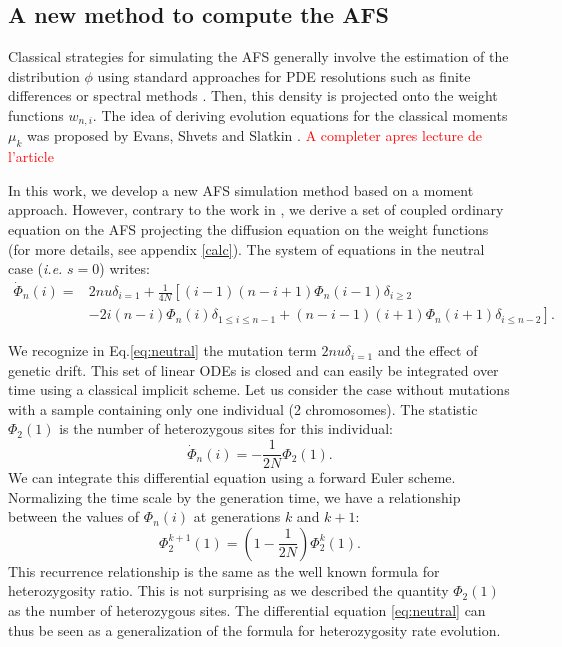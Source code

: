 \subsection{A new method to compute the AFS}
Classical strategies for simulating the AFS generally involve the estimation of the distribution $\phi$ using standard approaches for PDE resolutions such as finite differences \cite{gutenkunst2009} or spectral methods \cite{lukic2011}. Then, this density is projected onto the weight functions $w_{n,i}$.
The idea of deriving evolution equations for the classical moments $\mu_k$ was proposed by Evans, Shvets and Slatkin \cite{evans2007}. \textcolor{red}{A completer apres lecture de l'article}

In this work, we develop a new AFS simulation method based on a moment approach. However, contrary to the work in \cite{evans2007}, we derive a set of coupled ordinary equation on the AFS projecting the diffusion equation on the weight functions (for more details, see appendix \ref{calc}). The system of equations in the neutral case (\textit{i.e.} $s = 0$) writes:
\begin{equation}
\begin{split}
\dot \Phi_n(i)=& 2nu  \delta_{i=1} + \frac{1}{4 N} \left[ (i-1)(n-i+1) \Phi_n(i-1)\delta_{i\geq 2} \right.\\
		      & \left.-2i(n-i)\Phi_n(i)\delta_{1\leq i\leq n-1}  + (n-i-1)(i+1)\Phi_n(i+1)\delta_{i\leq n-2} \right].
\end{split}
\label{eq:neutral}
\end{equation}

We recognize in Eq.\eqref{eq:neutral} the mutation term $2nu  \delta_{i=1}$ and the effect of genetic drift. This set of linear ODEs is closed and can easily be integrated over time using a classical implicit scheme.
Let us consider the case without mutations with a sample containing only one individual (2 chromosomes). The statistic $\Phi_2(1)$ is the number of heterozygous sites for this individual: 
$$
	\dot \Phi_n(i)= -\frac{1}{2 N} \Phi_2(1).
$$
We can integrate this differential equation using a forward Euler scheme. Normalizing the time scale by the generation time, we have a relationship between the values of $\Phi_n(i)$ at generations $k$ and $k+1$:
$$
	\Phi_2^{k+1}(1) = (1-\frac{1}{2 N})\Phi_2^k(1).
$$
This recurrence relationship is the same as the well known formula for heterozygosity ratio. This is not surprising as we described the quantity $\Phi_2(1)$ as the number of heterozygous sites. The differential equation \eqref{eq:neutral} can thus be seen as a generalization of the formula for heterozygosity rate evolution.

